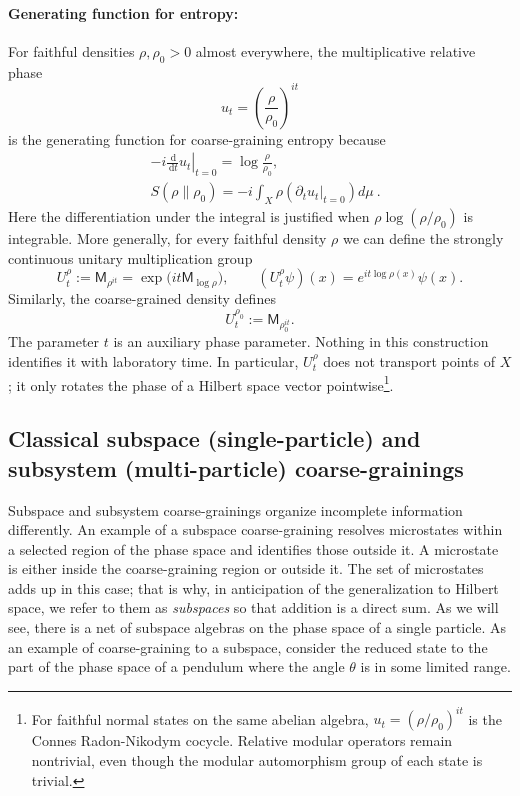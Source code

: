 \documentclass[a4paper,11pt]{article}
\theoremstyle{definition}
\newcommand{\dd}{\,\mathrm{d}}
\newcommand{\Mop}{\mathsf{M}}
\newcommand{\nn}{\nonumber}
\begin{document}
\paragraph{Generating function for entropy:} For faithful densities $\rho,\rho_0>0$ almost everywhere, the multiplicative relative phase 
\[
u_t
=
\left(\frac{\rho}{\rho_0}\right)^{it}
\]
is the generating function for coarse-graining entropy because 
\begin{align}
&-i\left.\frac{\dd}{\dd t}u_t\right|_{t=0}
=
\log\frac{\rho}{\rho_0},\nn\\
&S(\rho\|\rho_0)=-i \int_X \rho (\partial_t u_t\big|_{t=0})d\mu\ .
\end{align}
Here the differentiation under the integral is justified when $\rho\log(\rho/\rho_0)$ is integrable. More generally, for every faithful density $\rho$ we can define the strongly continuous unitary multiplication group
\[
  U_t^\rho:=\Mop_{\rho^{it}}
  =\exp\!\bigl(it\Mop_{\log\rho}\bigr),
  \qquad
  (U_t^\rho\psi)(x)=e^{it\log\rho(x)}\psi(x).
\]
Similarly, the coarse-grained density defines
\[
  U_t^{\rho_0}:=\Mop_{\rho_0^{it}}.
\]
The parameter $t$ is an auxiliary phase parameter. Nothing in this construction identifies it with laboratory time. In particular, $U_t^\rho$ does not transport points of $X$; it only rotates the phase of a Hilbert space vector pointwise\footnote{For faithful normal states on the same abelian algebra, $u_t=(\rho/\rho_0)^{it}$ is the Connes Radon-Nikodym cocycle. Relative modular operators remain nontrivial, even though the modular automorphism group of each state is trivial.}.

\subsection{Classical subspace (single-particle) and subsystem (multi-particle) coarse-grainings}
\label{subsec:classical-region-subsystem}

Subspace and subsystem coarse-grainings organize incomplete information differently. An example of a subspace coarse-graining resolves microstates within a selected region of the phase space and identifies those outside it. A microstate is either inside the coarse-graining region or outside it. The set of microstates adds up in this case; that is why, in anticipation of the generalization to Hilbert space, we refer to them as {\it subspaces} so that addition is a direct sum. As we will see, there is a net of subspace algebras on the phase space of a single particle. As an example of coarse-graining to a subspace, consider the reduced state to the part of the phase space of a pendulum where the angle $\theta$ is in some limited range. 
\end{document}
